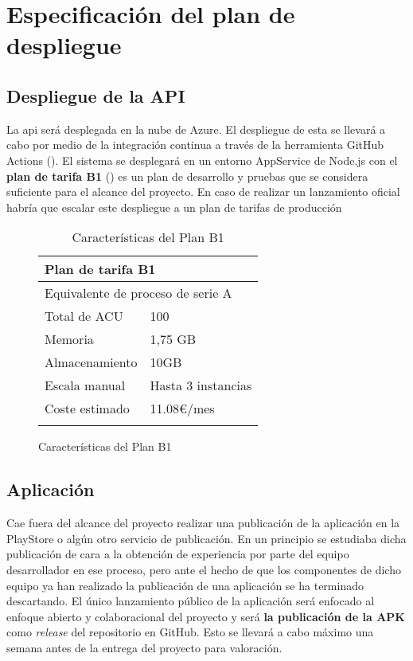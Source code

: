\chapter{Especificación del plan de despliegue}
\label{ch:especificacion_plan_despliegue}

\section{Despliegue de la API}
\label{sec:despliegue_api}

La \acrshort{api} será desplegada en la nube de Azure. El despliegue de esta se llevará a cabo por medio de la integración continua a través de la herramienta GitHub Actions (). El sistema se desplegará en un entorno AppService de Node.js con el \textbf{plan de tarifa B1} () es un plan de desarrollo y pruebas que se considera suficiente para el alcance del proyecto. En caso de realizar un lanzamiento oficial habría que escalar este despliegue a un plan de tarifas de producción

\begin{figure}[H]
\begin{longtable}{p{} p{}}
    \hline
    \multicolumn{2}{l}{\textbf{Plan de tarifa B1}} \\ \hline
    \multicolumn{2}{l}{Equivalente de proceso de serie A} \\
    Total de ACU      & 100 \\
    Memoria  & 1,75 GB \\
    Almacenamiento & 10GB \\
    Escala manual & Hasta 3 instancias \\
    Coste estimado & 11.08€/mes \\ \hline
    \caption{Características del Plan B1}
    \label{fig:plan_b1}
\end{longtable}
\end{figure}

\section{Aplicación}

Cae fuera del alcance del proyecto realizar una publicación de la aplicación en la PlayStore o algún otro servicio de publicación. En un principio se estudiaba dicha publicación de cara a la obtención de experiencia por parte del equipo desarrollador en ese proceso, pero ante el hecho de que los componentes de dicho equipo ya han realizado la publicación de una aplicación se ha terminado descartando. El único lanzamiento público de la aplicación será enfocado al enfoque abierto y colaboracional del proyecto y será \textbf{la publicación de la APK} como \emph{release} del repositorio en GitHub. Esto se llevará a cabo máximo una semana antes de la entrega del proyecto para valoración.